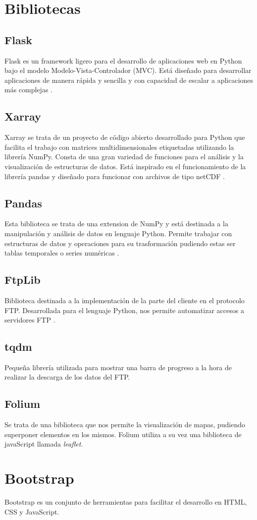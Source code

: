 \section{Bibliotecas}\label{librerias}
	\subsection{Flask}\label{Flask}
Flask es un framework ligero para el desarrollo de aplicaciones web en Python bajo el modelo Modelo-Vista-Controlador (MVC). Está diseñado para desarrollar aplicaciones de manera rápida y sencilla y con capacidad de escalar a aplicaciones más complejas \cite{flask}.
	\subsection{Xarray}\label{xarray}
Xarray se trata de un proyecto de código abierto desarrollado para Python que facilita el trabajo con matrices multidimensionales etiquetadas utilizando la librería NumPy. Consta de una gran variedad de funciones para el análisis y la visualización de estructuras de datos. Está inspirado en el funcionamiento de la librería pandas y diseñado para funcionar con archivos de tipo netCDF \cite{xarray}.	
	\subsection{Pandas}\label{pandas}
Esta biblioteca se trata de una extension de NumPy y está destinada a la manipulación y análisis de datos en lenguaje Python. Permite trabajar con estructuras de datos y operaciones para su trasformación pudiendo estas ser tablas temporales o series numéricas \cite{pandas}.
	\subsection{FtpLib}\label{FtpLib}
Biblioteca destinada a la implementación de la parte del cliente en el protocolo FTP. Desarrollada para el lenguaje Python, nos permite automatizar accesos a servidores FTP \cite{ftp_lib}.
	\subsection{tqdm}\label{tqdm}
Pequeña librería utilizada para mostrar una barra de progreso a la hora de realizar la descarga de los datos del FTP.
	\subsection{Folium}
Se trata de una biblioteca que nos permite la visualización de mapas, pudiendo superponer elementos en los mismos. Folium utiliza a su vez una biblioteca de javaScript llamada \emph{leaflet}.

	\section{Bootstrap}
Bootstrap es un conjunto de herramientas para facilitar el desarrollo en HTML, CSS y JavaScript.
